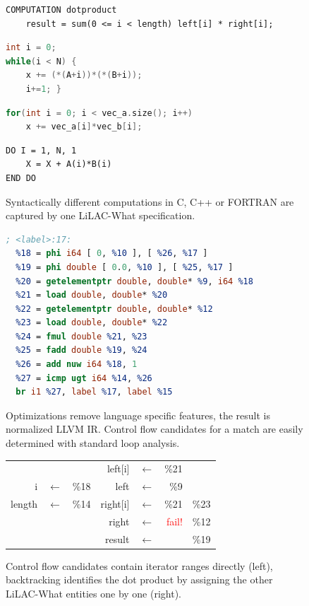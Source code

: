 \begin{figure}[p]
\begin{lstlisting}[language=LiLAC,numbers=none]
COMPUTATION dotproduct
    result = sum(0 <= i < length) left[i] * right[i];
\end{lstlisting}
\begin{lstlisting}[language=C,numbers=none]
int i = 0;
while(i < N) {
    x += (*(A+i))*(*(B+i));
    i+=1; }
\end{lstlisting}
\vspace{-0.75em}
\begin{lstlisting}[language=C++,numbers=none]
for(int i = 0; i < vec_a.size(); i++)
    x += vec_a[i]*vec_b[i];
\end{lstlisting}
\vspace{-0.75em}
\begin{lstlisting}[language=FORTRAN,numbers=none]
DO I = 1, N, 1
    X = X + A(i)*B(i)
END DO
\end{lstlisting}
\vspace{-0.75em}
\caption{Syntactically different computations in C, C++ or FORTRAN are captured
         by one LiLAC-What specification.}
\label{robustness}
\vspace{1em}
\begin{lstlisting}[language=llvm,numbers=none]
; <label>:17:
  %18 = phi i64 [ 0, %10 ], [ %26, %17 ]
  %19 = phi double [ 0.0, %10 ], [ %25, %17 ]
  %20 = getelementptr double, double* %9, i64 %18
  %21 = load double, double* %20
  %22 = getelementptr double, double* %12
  %23 = load double, double* %22
  %24 = fmul double %21, %23
  %25 = fadd double %19, %24
  %26 = add nuw i64 %18, 1
  %27 = icmp ugt i64 %14, %26
  br i1 %27, label %17, label %15
\end{lstlisting}
\vspace{-0.75em}
\caption{Optimizations remove language specific features, the result is
         normalized LLVM IR. Control flow candidates for a match are easily
         determined with standard loop analysis.}
\label{llvmexample}
\vspace{1em}
\begin{tabular}{rcr|rcrr}
       &              &      & left[i]  & $\leftarrow$&                 \%21   &     \\
     i & $\leftarrow$ & \%18 & left     & $\leftarrow$&                  \%9   &     \\
length & $\leftarrow$ & \%14 & right[i] & $\leftarrow$&                 \%21   & \%23\\
       &              &      & right    & $\leftarrow$& \textcolor{red}{fail!} & \%12\\
       &              &      & result   & $\leftarrow$&                        & \%19\\
\end{tabular}
\caption{Control flow candidates contain iterator ranges directly (left),
         backtracking identifies the dot product by assigning the other
         LiLAC-What entities one by one (right).}
\label{backtrack}
\end{figure}


